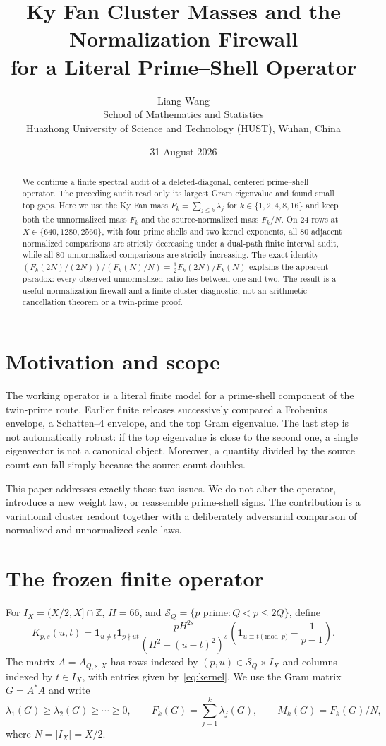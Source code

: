 \documentclass[10pt]{article}
\title{Ky Fan Cluster Masses and the Normalization Firewall\\
for a Literal Prime--Shell Operator}
\author{Liang Wang\\
School of Mathematics and Statistics\\
Huazhong University of Science and Technology (HUST), Wuhan, China}
\date{31 August 2026}
\begin{document}
\maketitle

\begin{abstract}
We continue a finite spectral audit of a deleted-diagonal, centered prime--shell
operator.  The preceding audit read only its largest Gram eigenvalue and found
small top gaps.  Here we use the Ky Fan mass
$F_k=\sum_{j\leq k}\lambda_j$ for $k\in\{1,2,4,8,16\}$ and keep both the
unnormalized mass $F_k$ and the source-normalized mass $F_k/N$.  On 24 rows
at $X\in\{640,1280,2560\}$, with four prime shells and two kernel exponents,
all 80 adjacent normalized comparisons are strictly decreasing under a
dual-path finite interval audit, while all 80 unnormalized comparisons are
strictly increasing.  The exact identity
$(F_k(2N)/(2N))/(F_k(N)/N)=\tfrac12 F_k(2N)/F_k(N)$ explains the apparent
paradox: every observed unnormalized ratio lies between one and two.  The
result is a useful normalization firewall and a finite cluster diagnostic, not
an arithmetic cancellation theorem or a twin-prime proof.
\end{abstract}

\section{Motivation and scope}

The working operator is a literal finite model for a prime-shell component of
the twin-prime route.  Earlier finite releases successively compared a
Frobenius envelope, a Schatten--4 envelope, and the top Gram eigenvalue.  The
last step is not automatically robust: if the top eigenvalue is close to the
second one, a single eigenvector is not a canonical object.  Moreover, a
quantity divided by the source count can fall simply because the source count
doubles.

This paper addresses exactly those two issues.  We do not alter the operator,
introduce a new weight law, or reassemble prime-shell signs.  The contribution
is a variational cluster readout together with a deliberately adversarial
comparison of normalized and unnormalized scale laws.

\section{The frozen finite operator}

For $I_X=(X/2,X]\cap\mathbb Z$, $H=66$, and
$\mathcal S_Q=\{p\text{ prime}:Q<p\leq 2Q\}$, define
\begin{equation}
 K_{p,s}(u,t)=\mathbf 1_{u\ne t}\mathbf 1_{p\nmid ut}
 \frac{pH^{2s}}{(H^2+(u-t)^2)^s}
 \left(\mathbf 1_{u\equiv t\pmod p}-\frac{1}{p-1}\right).
 \label{eq:kernel}
\end{equation}
The matrix $A=A_{Q,s,X}$ has rows indexed by $(p,u)\in\mathcal S_Q\times I_X$
and columns indexed by $t\in I_X$, with entries given by~\eqref{eq:kernel}.
We use the Gram matrix $G=A^*A$ and write
\[
 \lambda_1(G)\geq\lambda_2(G)\geq\cdots\geq0,
 \qquad F_k(G)=\sum_{j=1}^k\lambda_j(G),
 \qquad M_k(G)=F_k(G)/N,
\]
where $N=|I_X|=X/2$.
\end{document}
